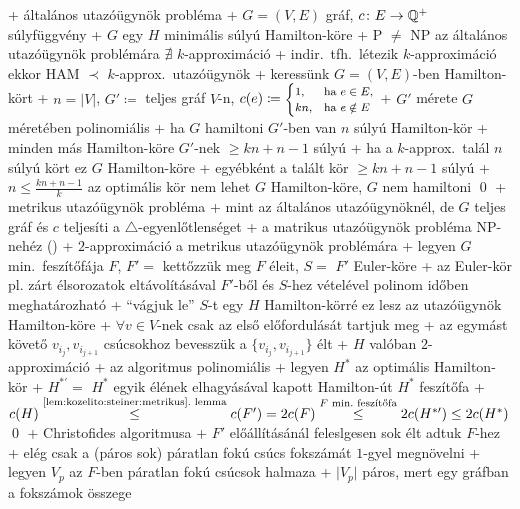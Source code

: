 + \prob általános utazóügynök probléma
  + \DataIn $G = (V, E)$ gráf, $c\colon E \to \mathbb{Q}^+$ súlyfüggvény
  + \DataOut $G$ egy $H$ minimális súlyú Hamilton-köre
  + \thm P $\ne$ NP \RA az általános utazóügynök problémára $\nexists$
    $k$-approximáció
    + \proof indir.~tfh.~létezik $k$-approximáció \RA ekkor HAM
      $\prec$ $k$-approx.~utazóügynök
    + keressünk $G = (V, E)$-ben Hamilton-kört
      + $n = \lvert V \rvert$, $G' \coloneqq$ teljes gráf $V$-n, $c(e)
        \coloneqq \text{\footnotesize$
          \begin{cases}
            1, & \text{ha $e \in E$,} \\
            kn, & \text{ha $e \notin E$}
          \end{cases}
          $}$
      + $G'$ mérete $G$ méretében polinomiális
      + ha $G$ hamiltoni \RA $G'$-ben van $n$ súlyú Hamilton-kör
      + minden más Hamilton-köre $G'$-nek $\ge kn + n - 1$ súlyú
    + ha a $k$-approx.~talál $n$ súlyú kört \RA ez $G$ Hamilton-köre
    + egyébként a talált kör $\ge kn + n - 1$ súlyú 
      + $n \le \frac{kn + n - 1}{k}$ \RA az optimális kör nem lehet
        $G$ Hamilton-köre, $G$ nem hamiltoni \qed
+ \prob metrikus utazóügynök probléma
  + \DataIn mint az általános utazóügynöknél, de $G$ teljes gráf és
    $c$ teljesíti a $\triangle$-egyenlőtlenséget
  + \thm a matrikus utazóügynök probléma NP-nehéz (\noproof)
+ \alg $2$-approximáció a metrikus utazóügynök problémára
  + legyen $G$ min.~feszítőfája $F$, $F' =$ kettőzzük meg $F$
    éleit, $S =$ $F'$ Euler-köre
    + az Euler-kör pl. zárt élsorozatok eltávolításával $F'$-ből és
      $S$-hez vételével polinom időben meghatározható
  + ``vágjuk le'' $S$-t egy $H$ Hamilton-körré \RA ez lesz az
    utazóügynök Hamilton-köre
    + $\forall v \in V$-nek csak az első előfordulását tartjuk meg
    + az egymást követő $v_{i_j}, v_{i_{j + 1}}$ csúcsokhoz bevesszük
      a $\{v_{i_j}, v_{i_{j + 1}}\}$ élt
  + \thm $H$ valóban $2$-approximáció
    + \proof az algoritmus polinomiális
    + legyen $H^*$ az optimális Hamilton-kör
      + $H^{*\prime} = $ $H^*$ egyik élének elhagyásával kapott
        Hamilton-út \RA $H^*$ feszítőfa
      + $c(H) \overset{\text{\ref{lem:kozelito:steiner:metrikus}.~lemma}}{\le}
        c(F') = 2 c(F) \overset{\text{$F$ min.~feszítőfa}}{\le} 2
        c(H^{*\prime}) \le 2 c(H^*)$ \qed
+ \alg Christofides algoritmusa
  + $F'$ előállításánál feleslgesen sok élt adtuk $F$-hez
    + elég csak a (páros sok) páratlan fokú csúcs fokszámát $1$-gyel
      megnövelni
  + legyen $V_p$ az $F$-ben páratlan fokú csúcsok halmaza
    + $\lvert V_p \rvert$ páros, mert egy gráfban a fokszámok összege
